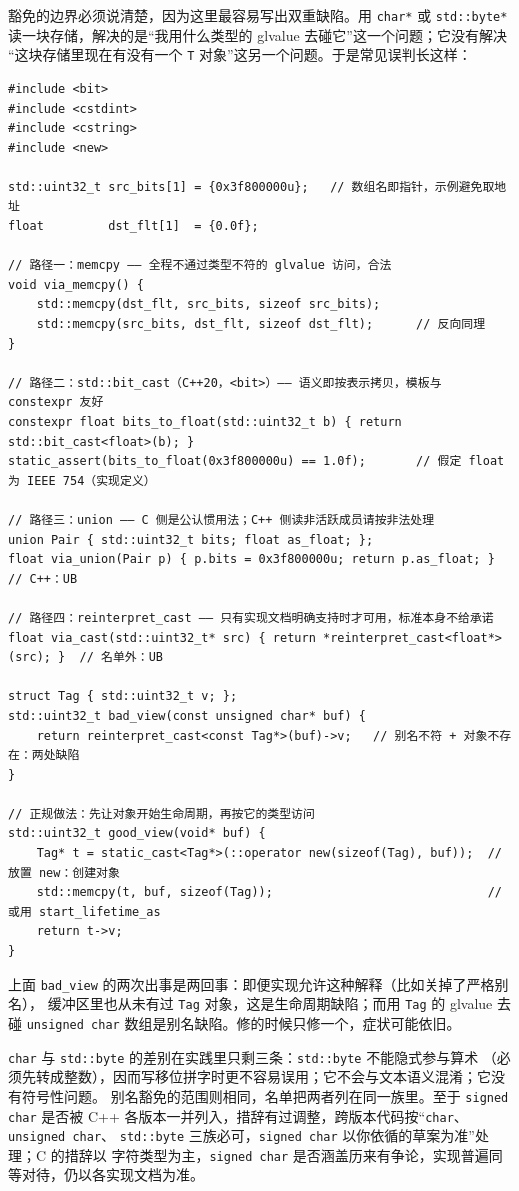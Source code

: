 \documentclass[12pt,a4paper,fontset=fandol]{ctexbook}
\newcommand{\Tp}[1]{\texttt{#1}}
\newcommand{\Lang}[1]{\textsf{#1}}
\newcommand{\CL}{\Lang{C}}
\newcommand{\CPP}{\Lang{C++}}
\begin{document}
豁免的边界必须说清楚，因为这里最容易写出双重缺陷。用 \Tp{char*} 或 \Tp{std::byte*}
读一块存储，解决的是“我用什么类型的 glvalue 去碰它”这一个问题；它没有解决
“这块存储里现在有没有一个 \Tp{T} 对象”这另一个问题。于是常见误判长这样：

\begin{lstlisting}[style=cppstyle, caption={四条合法双关路径与两条非法路径}]
#include <bit>
#include <cstdint>
#include <cstring>
#include <new>

std::uint32_t src_bits[1] = {0x3f800000u};   // 数组名即指针，示例避免取地址
float         dst_flt[1]  = {0.0f};

// 路径一：memcpy —— 全程不通过类型不符的 glvalue 访问，合法
void via_memcpy() {
    std::memcpy(dst_flt, src_bits, sizeof src_bits);
    std::memcpy(src_bits, dst_flt, sizeof dst_flt);      // 反向同理
}

// 路径二：std::bit_cast（C++20，<bit>）—— 语义即按表示拷贝，模板与 constexpr 友好
constexpr float bits_to_float(std::uint32_t b) { return std::bit_cast<float>(b); }
static_assert(bits_to_float(0x3f800000u) == 1.0f);       // 假定 float 为 IEEE 754（实现定义）

// 路径三：union —— C 侧是公认惯用法；C++ 侧读非活跃成员请按非法处理
union Pair { std::uint32_t bits; float as_float; };
float via_union(Pair p) { p.bits = 0x3f800000u; return p.as_float; }   // C++：UB

// 路径四：reinterpret_cast —— 只有实现文档明确支持时才可用，标准本身不给承诺
float via_cast(std::uint32_t* src) { return *reinterpret_cast<float*>(src); }  // 名单外：UB

struct Tag { std::uint32_t v; };
std::uint32_t bad_view(const unsigned char* buf) {
    return reinterpret_cast<const Tag*>(buf)->v;   // 别名不符 + 对象不存在：两处缺陷
}

// 正规做法：先让对象开始生命周期，再按它的类型访问
std::uint32_t good_view(void* buf) {
    Tag* t = static_cast<Tag*>(::operator new(sizeof(Tag), buf));  // 放置 new：创建对象
    std::memcpy(t, buf, sizeof(Tag));                              // 或用 start_lifetime_as
    return t->v;
}
\end{lstlisting}

上面 \Tp{bad\_view} 的两次出事是两回事：即便实现允许这种解释（比如关掉了严格别名），
缓冲区里也从未有过 \Tp{Tag} 对象，这是生命周期缺陷；而用 \Tp{Tag} 的 glvalue 去碰
\Tp{unsigned char} 数组是别名缺陷。修的时候只修一个，症状可能依旧。

\Tp{char} 与 \Tp{std::byte} 的差别在实践里只剩三条：\Tp{std::byte} 不能隐式参与算术
（必须先转成整数），因而写移位拼字时更不容易误用；它不会与文本语义混淆；它没有符号性问题。
别名豁免的范围则相同，名单把两者列在同一族里。至于 \Tp{signed char} 是否被 \CPP{}
各版本一并列入，措辞有过调整，跨版本代码按“\Tp{char}、\Tp{unsigned char}、
\Tp{std::byte} 三族必可，\Tp{signed char} 以你依循的草案为准”处理；\CL{} 的措辞以
字符类型为主，\Tp{signed char} 是否涵盖历来有争论，实现普遍同等对待，仍以各实现文档为准。
\end{document}
